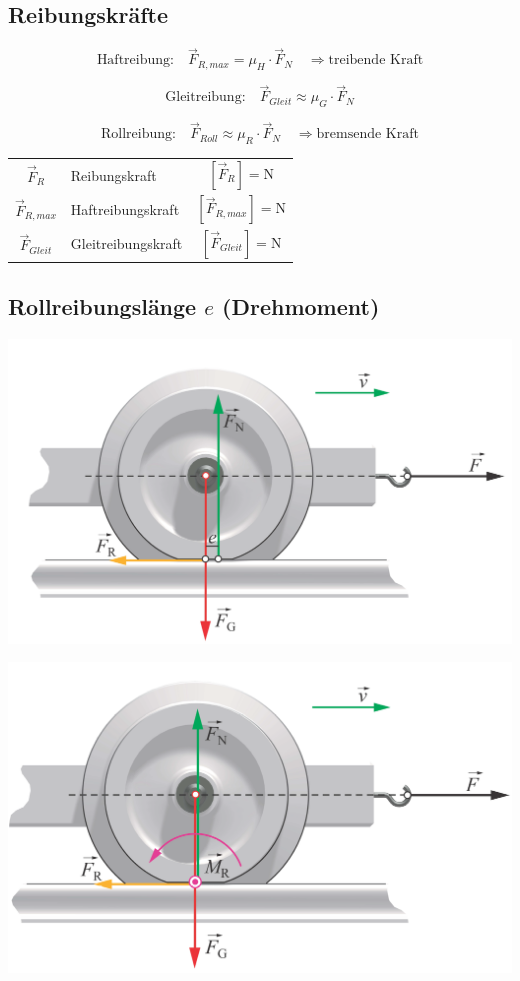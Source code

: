 \vfill\null
\columnbreak	

	\subsection{Reibungskräfte}

		$$ \boxed{ \text{Haftreibung:} \quad  \vec{F}_{R,max} = \mu_H \cdot \vec{F}_N \quad \Rightarrow \text{treibende Kraft} } $$
		
		$$ \boxed{ \text{Gleitreibung:} \quad \vec{F}_{Gleit} \approx \mu_G \cdot \vec{F}_N } $$ 
		
		$$ \boxed{ \text{Rollreibung:} \quad \vec{F}_{Roll} \approx \mu_R \cdot \vec{F}_N \quad \Rightarrow \text{bremsende Kraft} } $$
		
		\begin{tabular}{c l c}
			$\vec{F}_R$ & Reibungskraft & $[\vec{F}_R] = \mathrm{N}$ \\
			$\vec{F}_{R,max}$ & Haftreibungskraft & $[\vec{F}_{R,max}] = \mathrm{N}$ \\
			$\vec{F}_{Gleit}$ & Gleitreibungskraft & $[\vec{F}_{Gleit}] = \mathrm{N}$ \\
		\end{tabular}

	\subsection{Rollreibungslänge $e$ (Drehmoment)}

		\begin{minipage}{0.48\linewidth}
			\includegraphics[width=0.8\linewidth]{Bilder/rollreibung_1} \\
		\end{minipage}
		\hfill
		\begin{minipage}{0.48\linewidth}
			\includegraphics[width=0.8\linewidth]{Bilder/rollreibung_2} \\
		\end{minipage}
		
